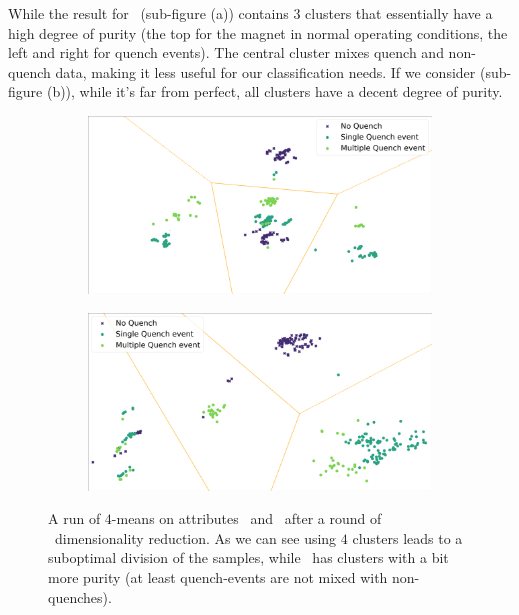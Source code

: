 While the result for \an\ (sub-figure (a)) contains $3$ clusters that essentially have a high degree
of purity (the top for the magnet in normal operating conditions, the left and right for quench
events). The central cluster mixes quench and non-quench data, making it less useful for our
classification needs. If we consider \cnmod (sub-figure (b)), while it's far from perfect, all
clusters have a decent degree of purity.
\begin{figure}[!ht]
	\centering
	\begin{subfigure}{0.8\linewidth}
		\centering
		\includegraphics[width=\linewidth]{img/clustering_an_qlp_4c.png}
		\caption{}
	\end{subfigure}
	\begin{subfigure}{0.8\linewidth}
		\centering
		\includegraphics[width=\linewidth]{img/clustering_cnmod_qlp_4c.png}
		\caption{}
	\end{subfigure}
	\caption{A run of $4$-means on attributes \an{}d \cnmod\ after a round of \pca\
		dimensionality reduction. As we can see using $4$ clusters leads to a suboptimal division of
		the samples, while \cnmod\ has clusters with a bit more purity (at least quench-events are
		not mixed with non-quenches).} \label{fig:4-means-results}
\end{figure}


